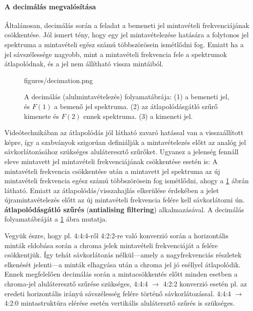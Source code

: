\paragraph{A decimálás megvalósítása}
Általánosan, decimálás során a feladat a bemeneti jel mintavételi frekvenciájának csökkentése.
Jól ismert tény, hogy egy jel mintavételezése hatására a folytonos jel spektruma a mintavételi egész számú többszörösein ismétlődni fog.
Emiatt ha a jel sávszélessége nagyobb, mint a mintavételi frekvencia fele a spektrumok átlapolódnak, és a jel nem állítható vissza mintáiból.
\begin{figure}[]
	\centering
	\begin{overpic}[width = 0.8\columnwidth ]{figures/decimation.png}
 	\end{overpic}
	\caption{A decimálás (alulmintavételezés) folyamatábrája: 
	(1) a bemeneti jel, és $F(1)$ a bemenő jel spektruma.
	(2) az átlapolódásgátló szűrő kimenete és $F(2)$ ennek spektruma.
	(3) a kimeneti jel.}
	\label{Fig:decimation}
\end{figure}
Videótechnikában az átlapolódás jól látható zavaró hatással van a visszaállított képre, így a szabványok szigorúan definiálják a mintavételezés előtt az analóg jel sávkorlátozásához szükséges aluláteresztő szűrőket.
Ugyanez a jelenség fennáll eleve mintavett jel mintavételi frekvenciájának csökkentése esetén is:
A mintavételi frekvencia csökkentése után a mintavett jel spektruma az új mintavételi frekvencia egész számú többszörösein fog ismétlődni, ahogy a \ref{Fig:decimation} ábrán látható.
Emiatt az átlapolódás/visszahajlás elkerülése érdekében a jelet újramintavételezés előtt az új mintavételi frekvencia felére kell sávkorlátozni ún. \textbf{átlapolódásgátló szűrés} (\textbf{antialising filtering}) alkalmazásával.
A decimálás folyamatábráját a \ref{Fig:decimation} ábra mutatja.

\vspace{3mm}
Vegyük észre, hogy pl. 4:4:4-ről 4:2:2-re való konverzió során a horizontális minták eldobása során a chroma jelek mintavételi frekvenciáját a felére csökkentjük.
Így tehát sávkorlátozás nélkül---amely a nagyfrekvenciás részletek elkenését jelenti---a minták elhagyása után a chroma jel jó eséllyel átlapolódik.
Ennek megfelelően decimálás során a mintacsökkentés előtt minden esetben a chroma-jel aluláteresztő szűrése szükséges, 4:4:4 $\rightarrow$ 4:2:2 konverzió esetén pl. az eredeti horizontális irányú sávszélesség felére történő sávkorlátozással.
4:4:4 $\rightarrow$ 4:2:0 mintastruktúra elérése esetén vertikális alulátersztő szűrés is szükséges.


